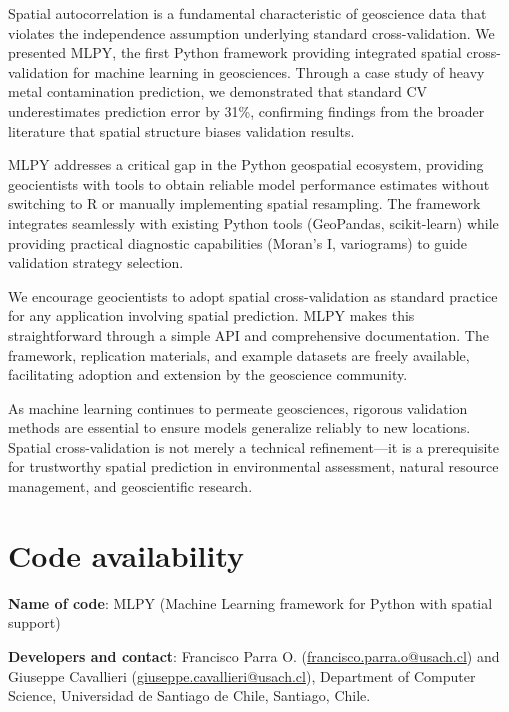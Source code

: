 \documentclass[a4paper,fleqn]{cas-sc}
\begin{document}
Spatial autocorrelation is a fundamental characteristic of geoscience data that violates the independence assumption underlying standard cross-validation. We presented MLPY, the first Python framework providing integrated spatial cross-validation for machine learning in geosciences. Through a case study of heavy metal contamination prediction, we demonstrated that standard CV underestimates prediction error by 31\%, confirming findings from the broader literature that spatial structure biases validation results.

MLPY addresses a critical gap in the Python geospatial ecosystem, providing geocientists with tools to obtain reliable model performance estimates without switching to R or manually implementing spatial resampling. The framework integrates seamlessly with existing Python tools (GeoPandas, scikit-learn) while providing practical diagnostic capabilities (Moran's I, variograms) to guide validation strategy selection.

We encourage geocientists to adopt spatial cross-validation as standard practice for any application involving spatial prediction. MLPY makes this straightforward through a simple API and comprehensive documentation. The framework, replication materials, and example datasets are freely available, facilitating adoption and extension by the geoscience community.

As machine learning continues to permeate geosciences, rigorous validation methods are essential to ensure models generalize reliably to new locations. Spatial cross-validation is not merely a technical refinement---it is a prerequisite for trustworthy spatial prediction in environmental assessment, natural resource management, and geoscientific research.


\section*{Code availability}

\textbf{Name of code}: MLPY (Machine Learning framework for Python with spatial support)

\textbf{Developers and contact}: Francisco Parra O. (\href{mailto:francisco.parra.o@usach.cl}{francisco.parra.o@usach.cl}) and Giuseppe Cavallieri (\href{mailto:giuseppe.cavallieri@usach.cl}{giuseppe.cavallieri@usach.cl}), Department of Computer Science, Universidad de Santiago de Chile, Santiago, Chile.
\end{document}
